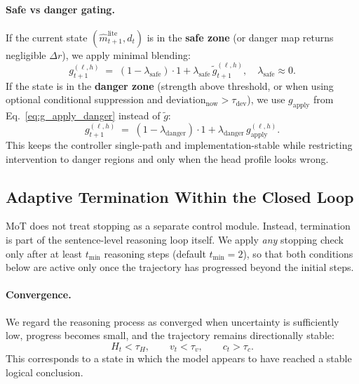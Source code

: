 \documentclass{article}
\begin{document}
\paragraph{Safe vs danger gating.}
If the current state $(\hat m^{\mathrm{lite}}_{t+1}, d_t)$ is in the \textbf{safe zone} (or danger map returns negligible $\Delta r$), we apply minimal blending:
\begin{equation}
g^{(\ell,h)}_{t+1} \;=\; (1-\lambda_{\mathrm{safe}})\cdot 1 + \lambda_{\mathrm{safe}}\, \tilde g^{(\ell,h)}_{t+1},
\quad \lambda_{\mathrm{safe}}\approx 0.
\label{eq:blend_safe}
\end{equation}
If the state is in the \textbf{danger zone} (strength above threshold, or when using optional conditional suppression and $\mathrm{deviation}_{\mathrm{now}} > \tau_{\mathrm{dev}}$), we use $g_{\mathrm{apply}}$ from Eq.~\eqref{eq:g_apply_danger} instead of $\tilde g$:
\begin{equation}
g^{(\ell,h)}_{t+1} \;=\; (1-\lambda_{\mathrm{danger}})\cdot 1 + \lambda_{\mathrm{danger}}\, g_{\mathrm{apply}}^{(\ell,h)}.
\label{eq:blend_danger}
\end{equation}
This keeps the controller single-path and implementation-stable while restricting intervention to danger regions and only when the head profile looks wrong.

\subsection{Adaptive Termination Within the Closed Loop}
\label{sec:termination}
MoT does not treat stopping as a separate control module. Instead, termination is part of the sentence-level reasoning loop itself. We apply \emph{any} stopping check only after at least $t_{\min}$ reasoning steps (default $t_{\min}=2$), so that both conditions below are active only once the trajectory has progressed beyond the initial steps.

\paragraph{Convergence.}
We regard the reasoning process as converged when uncertainty is sufficiently low, progress becomes small, and the trajectory remains directionally stable:
\begin{equation}
H_t < \tau_H,\qquad v_t < \tau_v,\qquad c_t > \tau_c.
\label{eq:converge}
\end{equation}
This corresponds to a state in which the model appears to have reached a stable logical conclusion.
\end{document}
